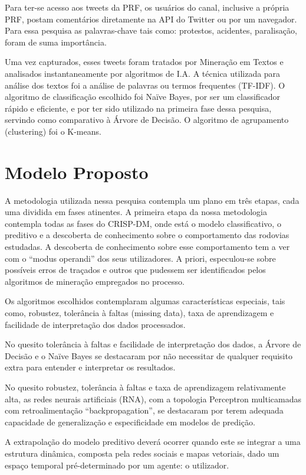 Para ter-se acesso aos tweets da PRF, os usuários do canal, inclusive a própria PRF, postam comentários diretamente 
na API do Twitter ou por um navegador. Para essa pesquisa as palavras-chave tais como: protestos, acidentes, paralisação, foram de suma importância.

Uma vez capturados, esses tweets foram tratados por Mineração em Textos e analisados instantaneamente por algoritmos de I.A. 
A técnica utilizada para análise dos textos foi a análise de palavras ou termos frequentes (TF-IDF). O algoritmo de classificação escolhido foi Naïve Bayes, por ser um classificador rápido e eficiente, e por ter sido utilizado na primeira fase dessa pesquisa, servindo como comparativo à Árvore de Decisão. O algoritmo de agrupamento (clustering) foi o K-means.



\section{Modelo Proposto}

A metodologia utilizada nessa pesquisa contempla um plano em três etapas, cada uma dividida em fases atinentes.
A primeira etapa da nossa metodologia contempla todas as fases do CRISP-DM, onde está o modelo classificativo, o preditivo e 
a descoberta de conhecimento sobre o comportamento das rodovias estudadas. A descoberta de conhecimento sobre esse comportamento 
 tem a ver com o ``modus operandi'' dos seus utilizadores. A priori, especulou-se sobre possíveis erros de traçados e outros que pudessem
ser identificados pelos algoritmos de mineração empregados no processo.

Os algoritmos escolhidos contemplaram algumas características especiais, tais como, robustez, tolerância à faltas (missing data),
taxa de aprendizagem e facilidade de interpretação dos dados processados. 

No quesito tolerância à faltas e facilidade de interpretação dos dados, a Árvore de Decisão e o Naïve Bayes se destacaram por não necessitar
de qualquer requisito extra para entender e interpretar os resultados.

No quesito robustez, tolerância à faltas e taxa de aprendizagem relativamente alta, as redes neurais artificiais (RNA), com a 
topologia Perceptron multicamadas com retroalimentação ``backpropagation'', se destacaram por terem adequada capacidade de generalização e especificidade em modelos de predição. 

A extrapolação do modelo preditivo deverá ocorrer quando este se integrar a uma estrutura dinâmica, composta pela redes sociais e mapas vetoriais, dado um espaço temporal pré-determinado por um agente: o utilizador. 

